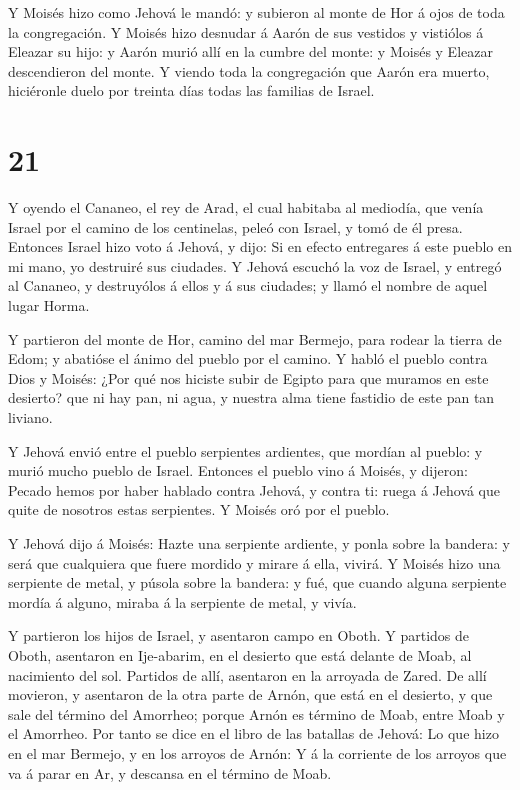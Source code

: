  Y Moisés hizo como Jehová le mandó: y subieron al monte de
Hor á ojos de toda la congregación.  Y Moisés hizo desnudar
á Aarón de sus vestidos y vistiólos á Eleazar su hijo: y Aarón murió
allí en la cumbre del monte: y Moisés y Eleazar descendieron del monte.
 Y viendo toda la congregación que Aarón era muerto,
hiciéronle duelo por treinta días todas las familias de Israel.

\hypertarget{section-20}{%
\section{21}\label{section-20}}

 Y oyendo el Cananeo, el rey de Arad, el cual habitaba al
mediodía, que venía Israel por el camino de los centinelas, peleó con
Israel, y tomó de él presa.  Entonces Israel hizo voto á
Jehová, y dijo: Si en efecto entregares á este pueblo en mi mano, yo
destruiré sus ciudades.  Y Jehová escuchó la voz de Israel,
y entregó al Cananeo, y destruyólos á ellos y á sus ciudades; y llamó el
nombre de aquel lugar Horma.

 Y partieron del monte de Hor, camino del mar Bermejo, para
rodear la tierra de Edom; y abatióse el ánimo del pueblo por el camino.
 Y habló el pueblo contra Dios y Moisés: ¿Por qué nos
hiciste subir de Egipto para que muramos en este desierto? que ni hay
pan, ni agua, y nuestra alma tiene fastidio de este pan tan liviano.

 Y Jehová envió entre el pueblo serpientes ardientes, que
mordían al pueblo: y murió mucho pueblo de Israel.  Entonces
el pueblo vino á Moisés, y dijeron: Pecado hemos por haber hablado
contra Jehová, y contra ti: ruega á Jehová que quite de nosotros estas
serpientes. Y Moisés oró por el pueblo.

 Y Jehová dijo á Moisés: Hazte una serpiente ardiente, y
ponla sobre la bandera: y será que cualquiera que fuere mordido y mirare
á ella, vivirá.  Y Moisés hizo una serpiente de metal, y
púsola sobre la bandera: y fué, que cuando alguna serpiente mordía á
alguno, miraba á la serpiente de metal, y vivía.

 Y partieron los hijos de Israel, y asentaron campo en
Oboth.  Y partidos de Oboth, asentaron en Ije-abarim, en el
desierto que está delante de Moab, al nacimiento del sol. 
Partidos de allí, asentaron en la arroyada de Zared.  De
allí movieron, y asentaron de la otra parte de Arnón, que está en el
desierto, y que sale del término del Amorrheo; porque Arnón es término
de Moab, entre Moab y el Amorrheo.  Por tanto se dice en el
libro de las batallas de Jehová: Lo que hizo en el mar Bermejo, y en los
arroyos de Arnón:  Y á la corriente de los arroyos que va á
parar en Ar, y descansa en el término de Moab.

